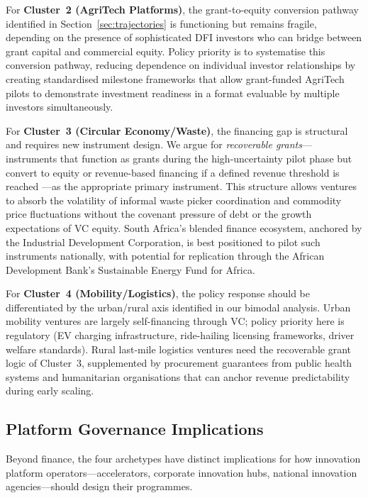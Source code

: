 \documentclass[review,12pt]{elsarticle}
\begin{document}
For \textbf{Cluster~2 (AgriTech Platforms)}, the grant-to-equity
conversion pathway identified in Section~\ref{sec:trajectories} is
functioning but remains fragile, depending on the presence of
sophisticated DFI investors who can bridge between grant capital and
commercial equity. Policy priority is to systematise this conversion
pathway, reducing dependence on individual investor relationships
by creating standardised milestone frameworks that allow grant-funded
AgriTech pilots to demonstrate investment readiness in a format
evaluable by multiple investors simultaneously.

For \textbf{Cluster~3 (Circular Economy/Waste)}, the financing gap
is structural and requires new instrument design. We argue for
\textit{recoverable grants}---instruments that function as grants
during the high-uncertainty pilot phase but convert to equity or
revenue-based financing if a defined revenue threshold is reached
---as the appropriate primary instrument. This structure allows
ventures to absorb the volatility of informal waste picker
coordination and commodity price fluctuations without the covenant
pressure of debt or the growth expectations of VC equity. South
Africa's blended finance ecosystem, anchored by the Industrial
Development Corporation, is best positioned to pilot such instruments
nationally, with potential for replication through the African
Development Bank's Sustainable Energy Fund for Africa.

For \textbf{Cluster~4 (Mobility/Logistics)}, the policy response
should be differentiated by the urban/rural axis identified in our
bimodal analysis. Urban mobility ventures are largely self-financing
through VC; policy priority here is regulatory (EV charging
infrastructure, ride-hailing licensing frameworks, driver welfare
standards). Rural last-mile logistics ventures need the recoverable
grant logic of Cluster~3, supplemented by procurement guarantees from
public health systems and humanitarian organisations that can anchor
revenue predictability during early scaling.

\subsection{Platform Governance Implications}

Beyond finance, the four archetypes have distinct implications for how
innovation platform operators---accelerators, corporate innovation
hubs, national innovation agencies---should design their programmes.
\end{document}
